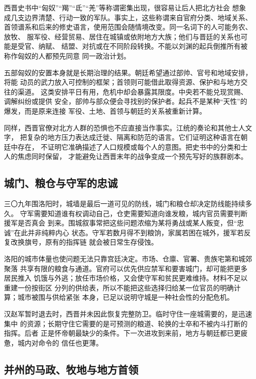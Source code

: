 西晋史书中“匈奴”“羯”“氐”“羌”等称谓密集出现，很容易让后人把北方社会
想象成几支边界清楚、行动一致的军队。事实上，这些称谓来自官府分类、地域关系、
首领谱系和后来的修史语言，使用范围会随情境改变。同一名词下的人可能务农、放牧、
服军役、经营贸易、居住在城镇或依附地方大族；他们与晋廷的关系也可能是受官、纳赋、
结盟、对抗或在不同阶段转换。不能以刘渊的起兵倒推所有被称作匈奴的人都预先同意
同一政治计划。

五部匈奴的安置本身就是长期治理的结果。朝廷希望通过部帅、官号和地域安排，将能
动员的武力放入可控制的框架；首领则可能借此取得资源、保护和与地方交往的渠道。
这类安排平日有用，危机中却会暴露其限度。中央若不能兑现赏赐、调解纠纷或提供
安全，部帅与部众便会寻找别的保护者。起兵不是某种“天性”的爆发，而是原来连接
军役、土地、首领与朝廷的关系被重新计算。

同样，西晋官僚对北方人群的恐惧也不应直接当作事实。江统的奏论和其他士人文字，
把复杂的地方压力表达成迁徙、隔离和防范的语言。它们证明这种语言在朝廷中存在，
不证明它准确描述了人口规模或每个人的意图。把史书中的分类和士人的焦虑同时保留，
才能避免让西晋末年的战争变成一个预先写好的族群剧本。

\subsection{城门、粮仓与守军的忠诚}

三〇九年围洛阳时，城墙是最后一道可见的防线，城门和粮仓却决定防线能持续多久。
守军需要知道谁有权调动自己，仓吏需要知道向谁发粮，城内官员需要判断援军是否真会
到来。围城叙事常把这些问题浓缩为某将勇战或某人叛变，但“忠诚”在此并非纯粹内心
状态。守军若数月得不到粮饷，家属若困在城外，援军若反复改换旗号，原有的指挥链
就会被日常生存侵蚀。

洛阳的城市体量也使问题无法只靠宫廷决定。市场、仓廪、官署、贵族宅第和城郊聚落
共享有限的粮食与通道。官府可以优先供应禁军和要害城门，却可能把更多居民推入
饥饿与外逃；放任市场价格，又会使守军和贫民更难维持。材料不足以重建一份按街区
分列的供给表，所以不能把这些选择归给某一位官员的明确计算；城市被围与供给紧张
本身，已足以说明守城是一种社会性的分配危机。

汉赵军暂时退去时，西晋并未因此恢复完整防卫。临时守住一座城需要的，是迅速集中
的资源；长期守住它需要的是可预测的粮道、轮换的士卒和不被内斗打断的指挥。后者
正是怀帝朝最缺少的条件。下一次进攻到来前，地方与朝廷都已更疲惫，城内对命令的
信任也更薄。

\subsection{并州的马政、牧地与地方首领}

